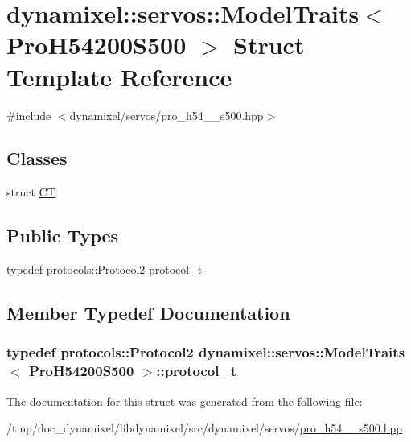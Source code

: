 \hypertarget{structdynamixel_1_1servos_1_1_model_traits_3_01_pro_h54200_s500_01_4}{}\section{dynamixel\+:\+:servos\+:\+:Model\+Traits$<$ Pro\+H54200\+S500 $>$ Struct Template Reference}
\label{structdynamixel_1_1servos_1_1_model_traits_3_01_pro_h54200_s500_01_4}


{\ttfamily \#include $<$dynamixel/servos/pro\+\_\+h54\+\_\+\_\+s500.\+hpp$>$}

\subsection*{Classes}
\begin{DoxyCompactItemize}
\item 
struct \hyperlink{structdynamixel_1_1servos_1_1_model_traits_3_01_pro_h54200_s500_01_4_1_1_c_t}{C\+T}
\end{DoxyCompactItemize}
\subsection*{Public Types}
\begin{DoxyCompactItemize}
\item 
typedef \hyperlink{classdynamixel_1_1protocols_1_1_protocol2}{protocols\+::\+Protocol2} \hyperlink{structdynamixel_1_1servos_1_1_model_traits_3_01_pro_h54200_s500_01_4_af47623764c69c322b468d6b418308540}{protocol\+\_\+t}
\end{DoxyCompactItemize}


\subsection{Member Typedef Documentation}
\hypertarget{structdynamixel_1_1servos_1_1_model_traits_3_01_pro_h54200_s500_01_4_af47623764c69c322b468d6b418308540}{}
\subsubsection[{protocol\+\_\+t}]{\setlength{\rightskip}{0pt plus 5cm}typedef {\bf protocols\+::\+Protocol2} {\bf dynamixel\+::servos\+::\+Model\+Traits}$<$ {\bf Pro\+H54200\+S500} $>$\+::{\bf protocol\+\_\+t}}\label{structdynamixel_1_1servos_1_1_model_traits_3_01_pro_h54200_s500_01_4_af47623764c69c322b468d6b418308540}


The documentation for this struct was generated from the following file\+:\begin{DoxyCompactItemize}
\item 
/tmp/doc\+\_\+dynamixel/libdynamixel/src/dynamixel/servos/\hyperlink{pro__h54__200__s500_8hpp}{pro\+\_\+h54\+\_\+\_\+s500.\+hpp}\end{DoxyCompactItemize}
